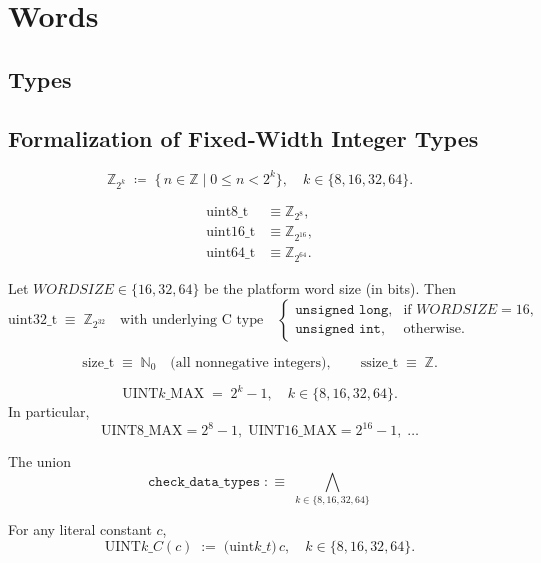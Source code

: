 \section{Words}

\subsection{Types}

\subsection*{Formalization of Fixed‐Width Integer Types}

\[
\mathbb{Z}_{2^k}
\;\coloneqq\;
\{\,n\in\mathbb{Z}\mid 0\le n < 2^k\},
\quad k\in\{8,16,32,64\}.
\]

\begin{align*}
	\mathrm{uint8\_t}  &\equiv \mathbb{Z}_{2^8},\\
	\mathrm{uint16\_t} &\equiv \mathbb{Z}_{2^{16}},\\
	\mathrm{uint64\_t} &\equiv \mathbb{Z}_{2^{64}}.
\end{align*}

Let \(\mathit{WORDSIZE}\in\{16,32,64\}\) be the platform word size (in bits).  Then
\[
\mathrm{uint32\_t}
\;\equiv\;
\mathbb{Z}_{2^{32}}
\quad\text{with underlying C type}
\quad
\begin{cases}
	\texttt{unsigned long},&\text{if }\mathit{WORDSIZE}=16,\\
	\texttt{unsigned int},&\text{otherwise.}
\end{cases}
\]

\[
\mathrm{size\_t}\;\equiv\;\mathbb{N}_0
\quad\text{(all nonnegative integers)},\qquad
\mathrm{ssize\_t}\;\equiv\;\mathbb{Z}.
\]

\[
\mathrm{UINT}k\_\mathrm{MAX} \;=\; 2^k - 1,
\quad k\in\{8,16,32,64\}.
\]
In particular,
\[
\mathrm{UINT8\_MAX}=2^8-1,\;
\mathrm{UINT16\_MAX}=2^{16}-1,\;\dots
\]

The union
\[
\texttt{check\_data\_types}
\;:\equiv\;
\bigwedge_{k\in\{8,16,32,64\}}
\]

For any literal constant \(c\),
\[
\mathrm{UINT}k\_C(c)
\;:=\;
\bigl(\mathrm{uint}k\_t\bigr)\,c,
\quad k\in\{8,16,32,64\}.
\]